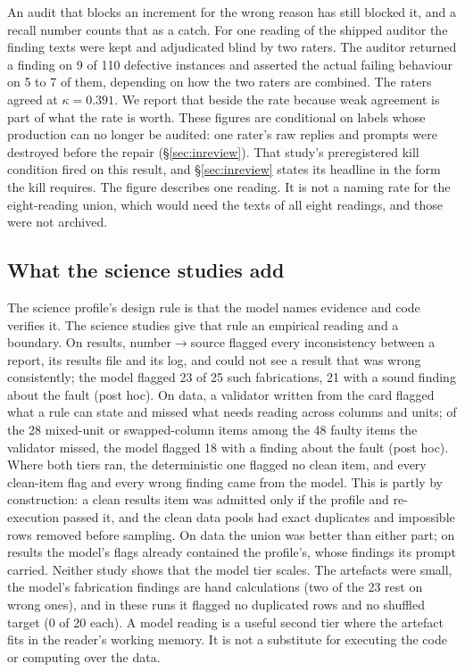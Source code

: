 An audit that blocks an increment for the wrong reason has still blocked it, and a recall number
counts that as a catch. For one reading of the shipped auditor the finding texts were kept and
adjudicated blind by two raters. The auditor returned a finding on 9 of 110 defective instances
and asserted the actual failing behaviour on 5 to 7 of them, depending on how the two raters are
combined. The raters agreed at $\kappa = 0.391$. We report that beside the rate because weak agreement
is part of what the rate is worth. These figures are conditional on labels whose production can no longer be audited: one rater's raw replies and prompts were destroyed before the repair (\S\ref{sec:inreview}). That study's preregistered kill condition fired on
this result, and \S\ref{sec:inreview} states its headline in the form the kill requires. The
figure describes one reading. It is not a naming rate for the eight-reading union, which would
need the texts of all eight readings, and those were not archived.

\subsection{What the science studies add}

The science profile's design rule is that the model names evidence and code verifies it. The
science studies give that rule an empirical reading and a boundary. On results, number$\to$source
flagged every inconsistency between a report, its results file and its log, and could not see a
result that was wrong consistently; the model flagged 23 of 25 such fabrications, 21 with a sound
finding about the fault (post hoc). On data, a validator written from the card flagged what a rule can
state and missed what needs reading across columns and units; of the 28 mixed-unit or swapped-column items among the 48 faulty items the validator missed, the model flagged 18 with a finding about the fault (post hoc).
Where both tiers ran, the deterministic one flagged no clean item, and every clean-item flag and every wrong finding came from the model. This is partly by construction: a clean results item was admitted only if the profile and re-execution passed it, and the clean data pools had exact duplicates and impossible rows removed before sampling. On data the union was better than either part; on results the
model's flags already contained the profile's, whose findings its prompt carried. Neither study shows
that the model tier scales. The artefacts were small, the model's fabrication findings are hand
calculations (two of the 23 rest on wrong ones), and in these runs it flagged no duplicated rows and no shuffled target (0 of 20 each). A model reading is a useful second tier where the artefact fits in the reader's
working memory. It is not a substitute for executing the code or computing over the data.

